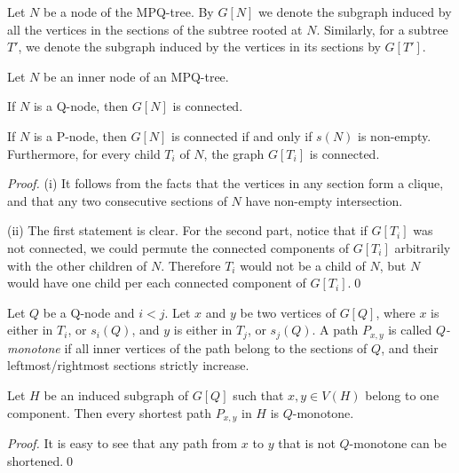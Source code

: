 Let $N$ be a node of the MPQ-tree. By $G[N]$ we denote the subgraph induced by all the
vertices in the sections of the subtree rooted at $N$. Similarly, for a subtree $T'$, we denote the
subgraph induced by the vertices in its sections by $G[T']$.

\begin{lemma} \label{lem:connectivness}
Let $N$ be an inner node of an MPQ-tree.
\begin{packed_itemize}
\item[(i)] If $N$ is a Q-node, then $G[N]$ is connected.
\item[(ii)] If $N$ is a P-node, then $G[N]$ is connected if and only if $s(N)$ is non-empty.
Furthermore, for every child $T_i$ of $N$, the graph $G[T_i]$ is connected.
\end{packed_itemize}
\end{lemma}

\begin{proof}
(i)
It follows from the facts that the vertices in any section form a clique, and that
any two consecutive sections of $N$ have non-empty intersection.

(ii) The first statement is clear. For the second part, notice that if $G[T_i]$ was not connected, we
could permute the connected components of $G[T_i]$ arbitrarily with the other children of $N$.  Therefore
$T_i$ would not be a child of $N$, but $N$ would have one child per each connected component of
$G[T_i]$.\qed
\end{proof}

Let $Q$ be a Q-node and $i < j$. Let $x$ and $y$ be two vertices of $G[Q]$, where $x$ is either
in $T_i$, or $s_i(Q)$, and $y$ is either in $T_j$, or $s_j(Q)$. A path $P_{x,y}$ is called
\emph{$Q$-monotone} if all inner vertices of the path belong to the sections of $Q$, and their
leftmost/rightmost sections strictly increase.

\begin{lemma} \label{lem:monotone_paths}
Let $H$ be an induced subgraph of $G[Q]$ such that $x,y \in V(H)$ belong to one component.
Then every shortest path $P_{x,y}$ in $H$ is $Q$-monotone.
\end{lemma}

\begin{proof}
It is easy to see that any path from $x$ to $y$ that is not $Q$-monotone can be shortened.\qed
\end{proof}

